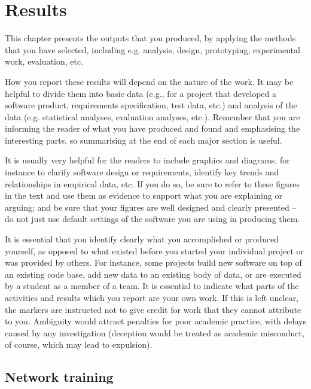 
\chapter{Results}

\label{Results} 

This chapter presents the outputs that you produced, by applying the methods that you have selected, including e.g. analysis, design, prototyping, experimental work, evaluation, etc.  
  
How you report these results will depend on the nature of the work. It may be helpful to divide them into basic data (e.g., for a project that developed a software product, requirements specification, test data, etc.) and analysis of the data (e.g. statistical analyses, evaluation analyses, etc.). Remember that you are informing the reader of what you have produced and found and emphasising the interesting parts, so summarising at the end of each major section is useful.  
  
It is usually very helpful for the readers to include graphics and diagrams, for instance to clarify software design or requirements, identify key trends and relationships in empirical data, etc. If you do so, be sure to refer to these figures in the text and use them as evidence to support what you are explaining or arguing; and be sure that your figures are well designed and clearly presented – do not just use default settings of the software you are using in producing them.  
  
It is essential that you identify clearly what you accomplished or produced yourself, as opposed to what existed before you started your individual project or was provided by others. For instance, some projects build new software on top of an existing code base, add new data to an existing body of data, or are executed by a student as a member of a team. It is essential to indicate what parts of the activities and results which you report are your own work. If this is left unclear, the markers are instructed not to give credit for work that they cannot attribute to you. Ambiguity would attract penalties for poor academic practice, with delays caused by any investigation (deception would be treated as academic misconduct, of course, which may lead to expulsion).


\section{Network training}

